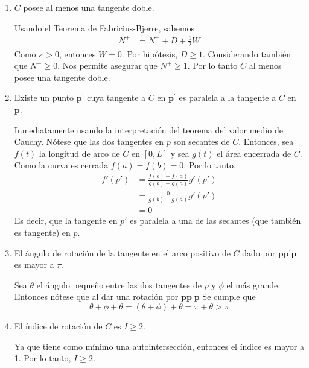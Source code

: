 \begin{problema}
    \begin{enumerate}
        \item $C$ posee al menos una tangente doble.
            \begin{sol}
                Usando el Teorema de Fabricius-Bjerre, 
                sabemos
                \begin{align*}
                    N^+ &=N^- +D +\frac{1}{2}W
                \end{align*}
                Como $\kappa>0$, entonces $W=0$. Por hipótesis, $D\geq 1$.  Considerando también que $N^-\geq 0$. Nos permite asegurar que $ N^+\geq 1$. Por lo tanto $C$ al menos posee una tangente doble. 
            \end{sol}
        \item Existe un punto $\mathbf{p}^{\prime}$ cuya tangente a $C$ en $\mathbf{p}^{\prime}$ es paralela a la tangente a $C$ en $\mathbf{p}$. 
        \begin{sol}
            Inmediatamente usando la interpretación del teorema del valor medio de Cauchy. Nótese que las dos tangentes en $p$ son secantes de $C$. Entonces, sea $f(t)$ la longitud de arco de $C$ en $[0,L]$ y sea $g(t)$ el área encerrada de $C$. Como la curva es cerrada $f(a)=f(b)=0$. Por lo tanto, 
            \begin{align*}
                f'(p') &= \frac{f(b)-f(a)}{g(b)-g(a)}g'(p')\\
                      &= \frac{0}{g(b)-g(a)}g'(p')\\
                      &= 0
            \end{align*}
            Es decir, que la tangente en $p'$ es paralela a una de las secantes (que también es tangente) en $p$. 
        \end{sol}
        \item El ángulo de rotación de la tangente en el arco positivo de $C$ dado por $\mathbf{p p}^{\prime} \mathbf{p}$ es mayor a $\pi$.
        \begin{sol}
            Sea $\theta$ el ángulo pequeño entre las dos tangentes de $p$ y $\phi$ el más grande. Entonces nótese que al dar una rotación por $\mathbf{p p}^{\prime} \mathbf{p}$ Se cumple que $$\theta+\phi +\theta = (\theta+\phi)+\theta = \pi +\theta >\pi $$  
        \end{sol}
        \item  El índice de rotación de $C$ es $I \geq 2$.
        \begin{sol}
            Ya que tiene como mínimo una autointersección, entonces el índice es mayor a 1. Por lo tanto, $I\geq 2$. 
        \end{sol}
    \end{enumerate}

\end{problema}

